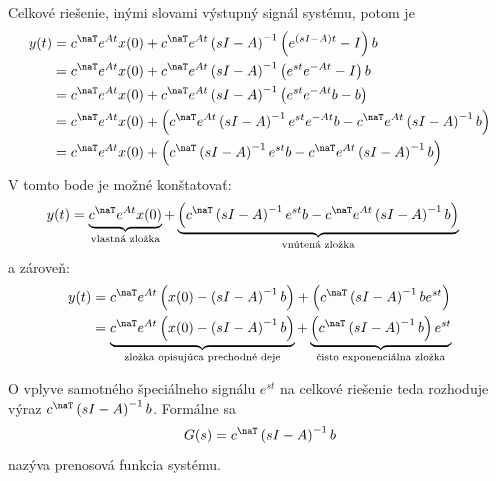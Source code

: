 \documentclass[a4paper, 10pt, ]{article}
\begin{document}
Celkové riešenie, inými slovami výstupný signál systému, potom je
\begin{align}
	\begin{aligned}
		y(t) &= c^\naT e^{At} x(0) + c^\naT e^{At} \left( sI - A \right)^{-1}  \left( e^{(sI-A)t} - I \right) b \\
		&= c^\naT e^{At} x(0) + c^\naT e^{At} \left( sI - A \right)^{-1}  \left( e^{st} e^{-At} - I \right) b \\
		&= c^\naT e^{At} x(0) + c^\naT e^{At} \left( sI - A \right)^{-1}  \left( e^{st} e^{-At}b - b \right) \\
		&= c^\naT e^{At} x(0) +   \left(c^\naT e^{At} \left( sI - A \right)^{-1} e^{st} e^{-At}b - c^\naT e^{At} \left( sI - A \right)^{-1} b \right) \\
		&= c^\naT e^{At} x(0) +   \left(c^\naT \left( sI - A \right)^{-1} e^{st} b - c^\naT e^{At} \left( sI - A \right)^{-1} b \right)
	\end{aligned}
\end{align}
V tomto bode je možné konštatovať:
\begin{align}
	\begin{aligned}
		y(t)
		&=
		\underbrace{
		c^\naT e^{At} x(0)
		}_{\text{vlastná zložka}}
		+
		\underbrace{
		\left(c^\naT \left( sI - A \right)^{-1} e^{st} b - c^\naT e^{At} \left( sI - A \right)^{-1} b \right)
		}_{\text{vnútená zložka}}
	\end{aligned}
\end{align}
a zároveň:
\begin{align}
    \begin{split}
        y(t) 
        &= 
        c^\naT e^{At} \left( x(0) -  \left( sI - A \right)^{-1} b\right) +   \left(c^\naT  \left( sI - A \right)^{-1}  b e^{st} \right) 
        \\
        &=
        \underbrace{
        c^\naT e^{At} \left( x(0) -  \left( sI - A \right)^{-1} b\right)
        }_{\text{zložka opisujúca prechodné deje}}
        +
        \underbrace{
        \left(c^\naT  \left( sI - A \right)^{-1}  b  \right) e^{st}
        }_{\text{čisto exponenciálna zložka}}
    \end{split}
\end{align}

O vplyve samotného špeciálneho signálu $e^{st}$ na celkové riešenie teda rozhoduje výraz $c^\naT  \left( sI - A \right)^{-1}  b$. Formálne sa
\begin{equation}
	G(s) = c^\naT  \left( sI - A \right)^{-1}  b
\end{equation}
nazýva prenosová funkcia systému.
\end{document}
